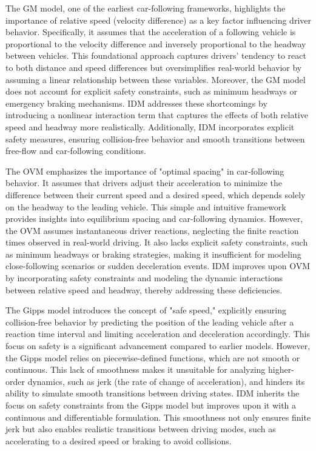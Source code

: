 \documentclass[a4paper,fleqn]{cas-sc}
\begin{document}
The GM model, one of the earliest car-following frameworks, highlights the importance of relative speed (velocity difference) as a key factor influencing driver behavior. Specifically, it assumes that the acceleration of a following vehicle is proportional to the velocity difference and inversely proportional to the headway between vehicles. This foundational approach captures drivers' tendency to react to both distance and speed differences but oversimplifies real-world behavior by assuming a linear relationship between these variables. Moreover, the GM model does not account for explicit safety constraints, such as minimum headways or emergency braking mechanisms. IDM addresses these shortcomings by introducing a nonlinear interaction term that captures the effects of both relative speed and headway more realistically. Additionally, IDM incorporates explicit safety measures, ensuring collision-free behavior and smooth transitions between free-flow and car-following conditions.

The OVM emphasizes the importance of "optimal spacing" in car-following behavior. It assumes that drivers adjust their acceleration to minimize the difference between their current speed and a desired speed, which depends solely on the headway to the leading vehicle. This simple and intuitive framework provides insights into equilibrium spacing and car-following dynamics. However, the OVM assumes instantaneous driver reactions, neglecting the finite reaction times observed in real-world driving. It also lacks explicit safety constraints, such as minimum headways or braking strategies, making it insufficient for modeling close-following scenarios or sudden deceleration events. IDM improves upon OVM by incorporating safety constraints and modeling the dynamic interactions between relative speed and headway, thereby addressing these deficiencies.

The Gipps model introduces the concept of "safe speed," explicitly ensuring collision-free behavior by predicting the position of the leading vehicle after a reaction time interval and limiting acceleration and deceleration accordingly. This focus on safety is a significant advancement compared to earlier models. However, the Gipps model relies on piecewise-defined functions, which are not smooth or continuous. This lack of smoothness makes it unsuitable for analyzing higher-order dynamics, such as jerk (the rate of change of acceleration), and hinders its ability to simulate smooth transitions between driving states. IDM inherits the focus on safety constraints from the Gipps model but improves upon it with a continuous and differentiable formulation. This smoothness not only ensures finite jerk but also enables realistic transitions between driving modes, such as accelerating to a desired speed or braking to avoid collisions.
\end{document}
